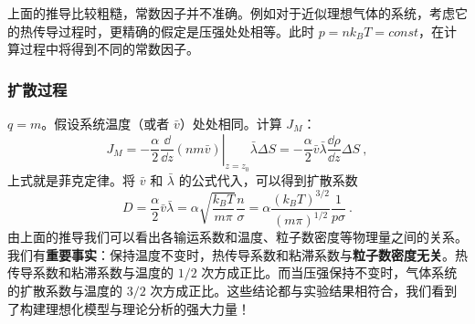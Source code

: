 上面的推导比较粗糙，常数因子并不准确。例如对于近似理想气体的系统，考虑它的热传导过程时，更精确的假定是压强处处相等。此时 $p=nk_BT=const$，在计算过程中将得到不同的常数因子。
\subsubsection{扩散过程}
$q=m$。假设系统温度（或者 $\bar v$）处处相同。计算 $J_M$：
\begin{equation}
J_M=-\frac{\alpha}{2}\left.\frac{\dd }{\dd z}(nm\bar v)\right|_{z=z_0}\bar\lambda \Delta S = -\frac{\alpha}{2}\bar v\bar\lambda \frac{\dd \rho}{\dd z}\Delta S~,
\end{equation}
上式就是菲克定律。将 $\bar v$ 和 $\bar\lambda$ 的公式代入，可以得到扩散系数
\begin{equation}
D=\frac{\alpha}{2}\bar v\bar \lambda = \alpha\sqrt{\frac{k_BT}{m\pi}}\frac{n}{\sigma} =  \alpha\frac{(k_B T)^{3/2}}{(m\pi)^{1/2}}\frac{1}{p\sigma}~.
\end{equation}
由上面的推导我们可以看出各输运系数和温度、粒子数密度等物理量之间的关系。我们有\textbf{重要事实}：保持温度不变时，热传导系数和粘滞系数与\textbf{粒子数密度无关}。热传导系数和粘滞系数与温度的 $1/2$ 次方成正比。而当压强保持不变时，气体系统的扩散系数与温度的 $3/2$ 次方成正比。这些结论都与实验结果相符合，我们看到了构建理想化模型与理论分析的强大力量！
